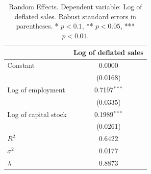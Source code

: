 \begin{table}[!htbp]
\centering
\begin{tabular}{lc}
\toprule
 & Log of deflated sales \\
\midrule
Constant & 0.0000 \\
 & (0.0168) \\
\addlinespace
Log of employment & 0.7197$^{***}$ \\
 & (0.0335) \\
\addlinespace
Log of capital stock & 0.1989$^{***}$ \\
 & (0.0261) \\
\midrule
$R^2$ & 0.6422 \\
$\sigma^2$ & 0.0177 \\
$\lambda$ & 0.8873 \\
\bottomrule
\end{tabular}
\caption{Random Effects. Dependent variable: Log of deflated sales. Robust standard errors in parentheses. * $p<0.1$, ** $p<0.05$, *** $p<0.01$.}
\label{tab:random_effects}
\end{table}
